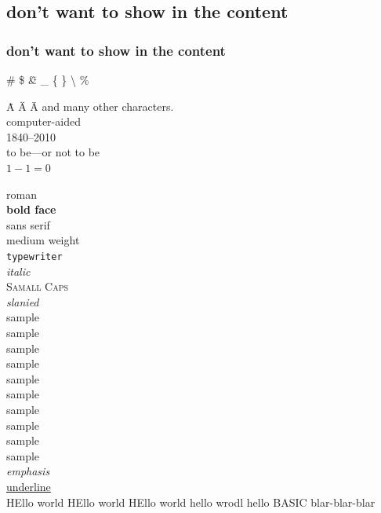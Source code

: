 \documentclass[UTF8]{article}
\begin{document}
\subsection*{don't want to show in the content}
\subsubsection*{don't want to show in the content}


\# 
\$ 
\~ 
\& 
\_ 
\{ 
\} 
\- 
\textbackslash 
\%

\.{A} \"{A} \={A}  and many other characters.\\

computer-aided\\
1840--2010\\
to be---or not to be\\
$1-1=0$

\textrm{roman} \\
\textbf{bold face} \\
\textsf{sans serif} \\
\textmd{medium weight} \\
\texttt{typewriter} \\
\textit{italic} \\
\textsc{Samall Caps} \\
\textsl{slanied}\\

\tiny{sample}\\
\scriptsize{sample}\\
\footnotesize{sample}\\
\small{sample}\\
\normalsize{sample}\\
\large{sample}\\
\Large{sample}\\
\LARGE{sample}\\
\huge{sample}\\
\Huge{sample}\\

\normalsize
\emph{emphasis}\\
\underline{underline}\\

HEllo world HEllo world HEllo world  hello wrodl hello BASIC blar-blar-blar
\end{document}
